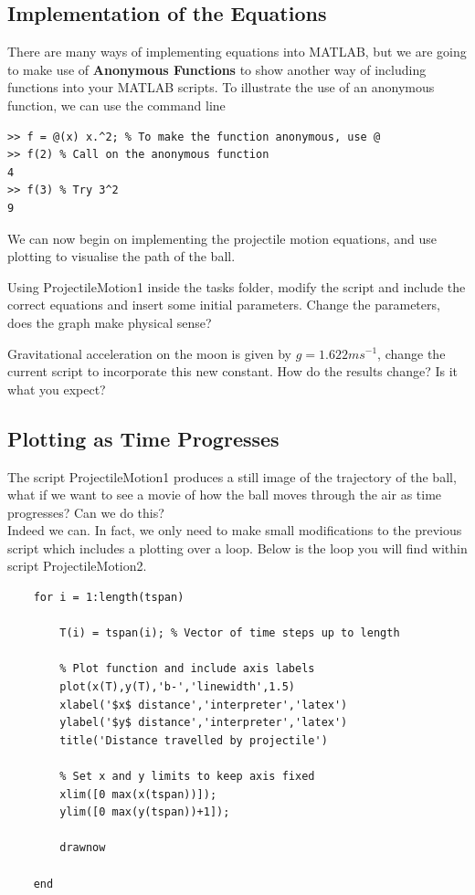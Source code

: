 \documentclass[12pt]{report}
\begin{document}
\subsection*{Implementation of the Equations}
There are many ways of implementing equations into MATLAB, but we are going to make use of \textbf{Anonymous Functions} to show another way of including functions into your MATLAB scripts. To illustrate the use of an anonymous function, we can use the command line
\begin{lstlisting}
>> f = @(x) x.^2; % To make the function anonymous, use @
>> f(2) % Call on the anonymous function
4
>> f(3) % Try 3^2
9
\end{lstlisting}
We can now begin on implementing the projectile motion equations, and use plotting to visualise the path of the ball.\\
 
\begin{tcolorbox}[title=Task (Moderate)]
Using ProjectileMotion1 inside the tasks folder, modify the script and include the correct equations and insert some initial parameters. Change the parameters, does the graph make physical sense?
\end{tcolorbox}

\begin{tcolorbox}[title=Task (Easy)]
Gravitational acceleration on the moon is given by $g = 1.622ms^{-1}$, change the current script to incorporate this new constant. How do the results change? Is it what you expect?
\end{tcolorbox}

\subsection*{Plotting as Time Progresses}
The script ProjectileMotion1 produces a still image of the trajectory of the ball, what if we want to see a movie of how the ball moves through the air as time progresses? Can we do this?\\

\noindent Indeed we can. In fact, we only need to make small modifications to the previous script which includes a plotting over a loop. Below is the loop you will find within script ProjectileMotion2.

\begin{lstlisting}
    for i = 1:length(tspan)
    
        T(i) = tspan(i); % Vector of time steps up to length
        
        % Plot function and include axis labels
        plot(x(T),y(T),'b-','linewidth',1.5)
        xlabel('$x$ distance','interpreter','latex')
        ylabel('$y$ distance','interpreter','latex')
        title('Distance travelled by projectile')
        
        % Set x and y limits to keep axis fixed
        xlim([0 max(x(tspan))]); 
        ylim([0 max(y(tspan))+1]);
        
        drawnow
        
    end
\end{lstlisting}
\end{document}
